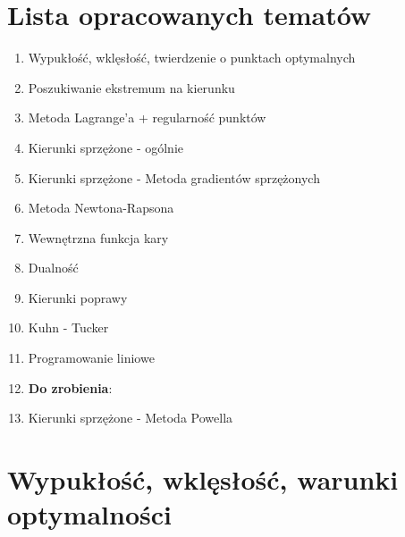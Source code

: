 \documentclass[a4paper,11pt]{article}
\begin{document}
\tableofcontents

\newpage
\section{Lista opracowanych tematów}
\begin{enumerate}

\item Wypukłość, wklęsłość, twierdzenie o punktach optymalnych


\item Poszukiwanie ekstremum na kierunku


\item Metoda Lagrange'a + regularność punktów 


\item Kierunki sprzężone - ogólnie


\item Kierunki sprzężone - Metoda gradientów sprzężonych


\item Metoda Newtona-Rapsona


\item Wewnętrzna funkcja kary

\item Dualność

\item Kierunki poprawy

\item Kuhn - Tucker

\item Programowanie liniowe

\item \textbf{Do zrobienia}:
\item Kierunki sprzężone - Metoda Powella



\end{enumerate}


\newpage
\section{Wypukłość, wklęsłość, warunki optymalności}
\end{document}
